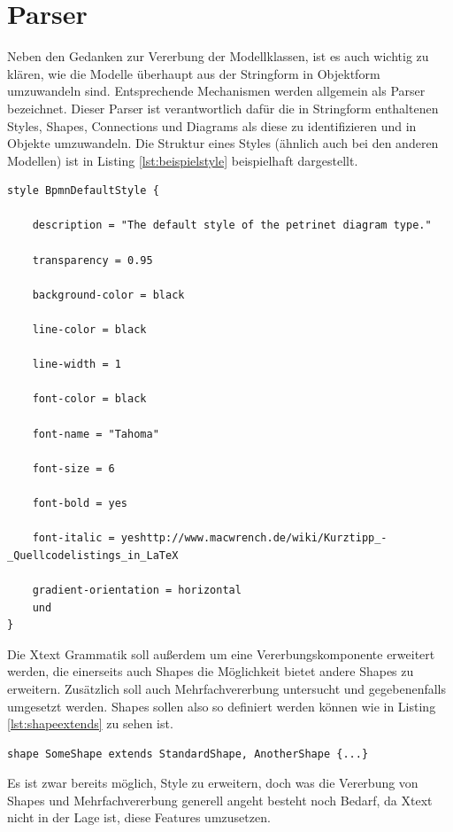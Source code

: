 \section{Parser}Neben den Gedanken zur Vererbung der Modellklassen, ist es auch wichtig zu klären, wie die Modelle überhaupt aus der Stringform in Objektform umzuwandeln sind. Entsprechende Mechanismen werden allgemein als Parser bezeichnet. Dieser Parser ist verantwortlich dafür die in Stringform enthaltenen Styles, Shapes, Connections und Diagrams als diese zu identifizieren und in Objekte umzuwandeln. 
Die Struktur eines Styles (ähnlich auch bei den anderen Modellen) ist in Listing \ref{lst:beispielstyle} beispielhaft dargestellt.
\begin{center}
\label{lst:beispielstyle}
\begin{lstlisting}[style=spray, caption={Beispielhafte Style Definition über die entsprechende Style DSL},label={lst:beispielstyle}]
style BpmnDefaultStyle {

	description = "The default style of the petrinet diagram type."
	
	transparency = 0.95

	background-color = black
	
	line-color = black

	line-width = 1

	font-color = black

	font-name = "Tahoma"
	
	font-size = 6

	font-bold = yes

	font-italic = yeshttp://www.macwrench.de/wiki/Kurztipp_-_Quellcodelistings_in_LaTeX

	gradient-orientation = horizontal
	und
}
\end{lstlisting}
\end{center}
Die Xtext Grammatik soll außerdem um eine Vererbungskomponente erweitert werden, die einerseits auch Shapes die Möglichkeit bietet andere Shapes zu erweitern. Zusätzlich soll auch Mehrfachvererbung untersucht und gegebenenfalls umgesetzt werden. Shapes sollen also so definiert werden können wie in Listing \ref{lst:shapeextends} zu sehen ist.
\begin{lstlisting}[style=spray, caption = {(Mehrfach)Vererbung bei einer Shape Definition}, label = {lst:shapeextends}]
shape SomeShape extends StandardShape, AnotherShape {...}
\end{lstlisting}Es ist zwar bereits möglich, Style zu erweitern, doch was die Vererbung von Shapes und Mehrfachvererbung generell angeht besteht noch Bedarf, da Xtext nicht in der Lage ist, diese Features umzusetzen.
